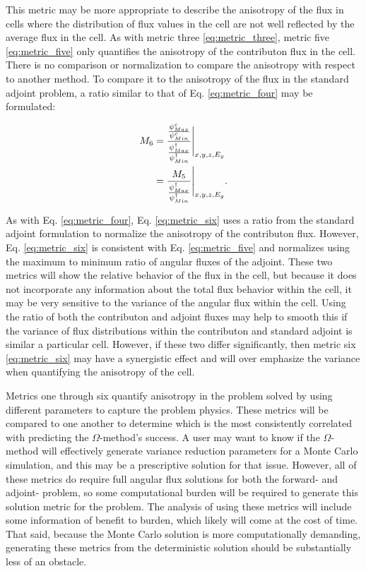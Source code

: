 This metric may be more appropriate to describe the anisotropy of the flux in
cells where the distribution of flux values in the cell are not well
reflected by the average flux in the cell. As with metric three \eqref{eq:metric_three}, metric five
\eqref{eq:metric_five} only quantifies
the anisotropy of the contributon flux in the cell. There is no comparison or
normalization to compare the anisotropy with respect to another method. To
compare it to the anisotropy of the flux in the standard adjoint
problem, a ratio similar to that of Eq. \eqref{eq:metric_four} may be
formulated:

\begin{equation}
  \begin{split}
    M_{6} & =  \frac{\frac{\psi^{c}_{Max}}{\psi^{c}_{
                  Min}}}{\frac{\psi^{\dagger}_{
                  Max}}{\psi^{\dagger}_{Min}}} \Bigg\rvert_{x,y,z,E_g} \\
          & = \frac{M_{5}}{\frac{\psi^{\dagger}_{Max}}
                  {\psi^{\dagger}_{Min}}} \Bigg\rvert_{x,y,z,E_g}  .
  \end{split}
  \label{eq:metric_six}
\end{equation}

As with Eq. \eqref{eq:metric_four}, Eq. \eqref{eq:metric_six} uses a ratio from
the standard adjoint formulation to normalize the anisotropy of the
contributon flux. However, Eq. \eqref{eq:metric_six} is consistent with Eq.
\eqref{eq:metric_five} and normalizes using the maximum to minimum
ratio of angular fluxes of the adjoint. These two
metrics will show the relative behavior of the flux in the cell, but because it
does not incorporate any information about the total flux behavior within the
cell, it may be very sensitive to the variance of the angular flux within the
cell. Using the ratio of both the contributon and adjoint fluxes may
help to smooth this if the variance of flux distributions within the contributon
and standard adjoint is similar a particular cell. However, if these two
differ significantly, then metric six \eqref{eq:metric_six} may have a
synergistic effect
and will over emphasize the variance when quantifying the anisotropy of the
cell.

Metrics one through six quantify anisotropy
in the problem solved by using different parameters to capture the problem
physics. These metrics will be compared to one another to determine which is the
most consistently correlated with predicting the $\Omega$-method's success. A
user may want to know if the $\Omega$-method will effectively generate variance
reduction parameters for a Monte Carlo simulation, and this may be a
prescriptive solution for that issue. However, all of these metrics do require
full angular flux solutions for both the forward- and adjoint- problem, so some
computational burden will be required to generate this solution metric for the
problem. The analysis of using these metrics will include some information of
benefit to burden, which likely will come at the cost of time.
That said, because the Monte Carlo solution is more computationally
demanding, generating these metrics from the deterministic solution should be
substantially less of an obstacle.


